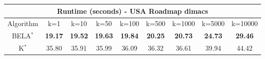 \begin{tabular}{c|cccccccc}\toprule
\multicolumn{9}{c}{Runtime (seconds) - USA Roadmap dimacs}\\ \midrule
Algorithm & k=1 & k=10 & k=50 & k=100 & k=500 & k=1000 & k=5000 & k=10000 \\ \midrule
BELA$^*$ & \textbf{19.17} & \textbf{19.52} & \textbf{19.63} & \textbf{19.84} & \textbf{20.25} & \textbf{20.73} & \textbf{24.73} & \textbf{29.46} \\
K$^*$ & 35.80 & 35.91 & 35.99 & 36.09 & 36.32 & 36.61 & 39.94 & 44.42 \\ \bottomrule 
\end{tabular}
